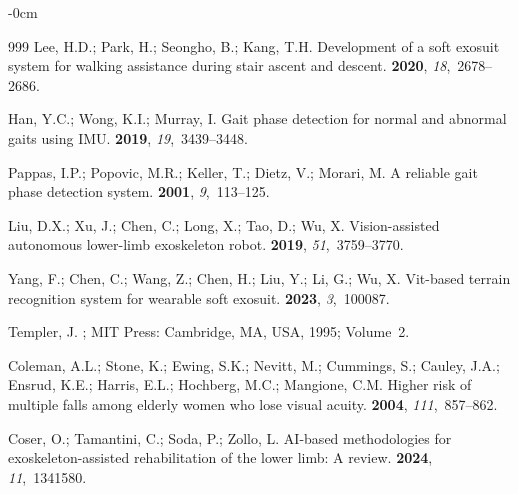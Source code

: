 \documentclass[actuators,article,accept,pdftex,moreauthors]{Definitions/mdpi}
\begin{document}
\begin{adjustwidth}{-\extralength}{0cm}
\begin{thebibliography}{999}
Lee, H.D.; Park, H.; Seongho, B.; Kang, T.H.
\newblock Development of a soft exosuit system for walking assistance during
  stair ascent and descent.
 {\bf
  2020}, {\em 18},~2678--2686.

Han, Y.C.; Wong, K.I.; Murray, I.
\newblock Gait phase detection for normal and abnormal gaits using IMU.
 {\bf 2019}, {\em 19},~3439--3448.

Pappas, I.P.; Popovic, M.R.; Keller, T.; Dietz, V.; Morari, M.
\newblock A reliable gait phase detection system.
 {\bf 2001}, {\em 9},~113--125.

Liu, D.X.; Xu, J.; Chen, C.; Long, X.; Tao, D.; Wu, X.
\newblock Vision-assisted autonomous lower-limb exoskeleton robot.
  {\bf 2019}, {\em 51},~3759--3770.

Yang, F.; Chen, C.; Wang, Z.; Chen, H.; Liu, Y.; Li, G.; Wu, X.
\newblock Vit-based terrain recognition system for wearable soft exosuit.
 {\bf 2023}, {\em
  3},~100087.

Templer, J.
;
   MIT Press: {Cambridge, MA, USA,} %
   1995; Volume~2.

Coleman, A.L.; Stone, K.; Ewing, S.K.; Nevitt, M.; Cummings, S.; Cauley, J.A.;
  Ensrud, K.E.; Harris, E.L.; Hochberg, M.C.; Mangione, C.M.
\newblock Higher risk of multiple falls among elderly women who lose visual
  acuity.
 {\bf 2004}, {\em 111},~857--862.

Coser, O.; Tamantini, C.; Soda, P.; Zollo, L.
\newblock AI-based methodologies for exoskeleton-assisted rehabilitation of the
  lower limb: A review.
 {\bf 2024}, {\em 11},~1341580.


\end{thebibliography}
\end{adjustwidth}
\end{document}
